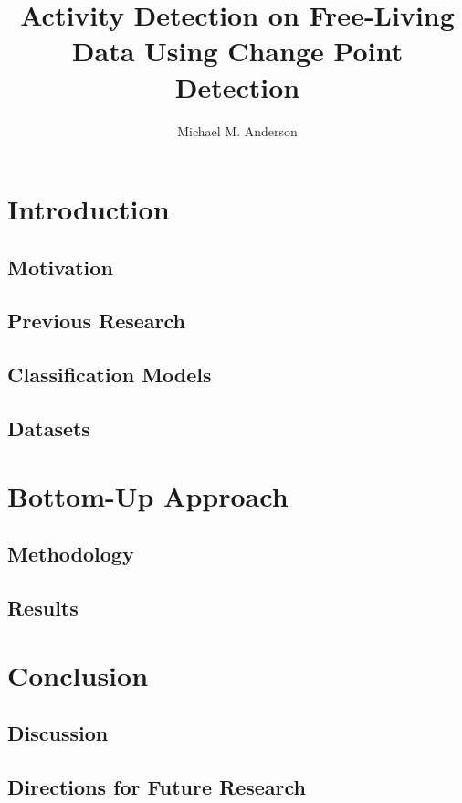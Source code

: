 \documentclass[onehalf,11pt]{beavtex}
\title{Activity Detection on Free-Living Data Using Change Point Detection}
\author{Michael M. Anderson}
\begin{document}
\maketitle
\mainmatter


\chapter{Introduction}
\section{Motivation}
\section{Previous Research}
\section{Classification Models}
\section{Datasets}






\chapter{Bottom-Up Approach}
\section{Methodology}
\section{Results}


\chapter{Conclusion}
\section{Discussion}
\section{Directions for Future Research}






%
\end{document}
